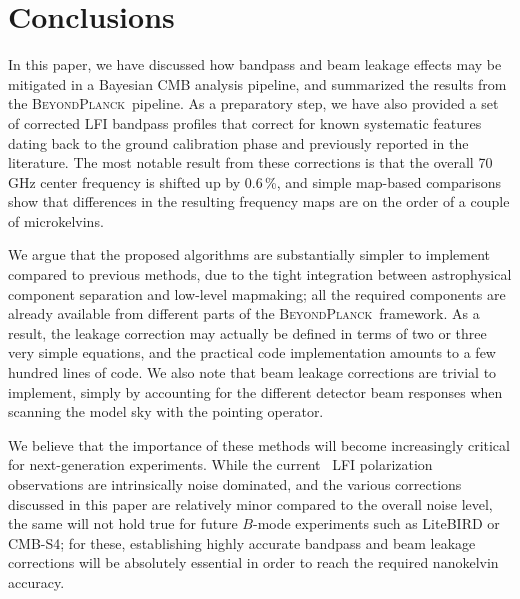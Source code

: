 \documentclass[twocolumn]{aa}
\newcommand{\BP}{\textsc{BeyondPlanck}}
\newcommand{\?}[1]{\textcolor{red}{{\bf [#1]}}}
\begin{document}
\section{Conclusions}
\label{sec:conclusion}

In this paper, we have discussed how bandpass and beam leakage effects may be
mitigated in a Bayesian CMB analysis pipeline, and summarized the results from
the \BP\ pipeline. As a preparatory step, we have also provided a set of
corrected LFI bandpass profiles that correct for known systematic features
dating back to the ground calibration phase and previously reported in the
literature. The most notable result from these corrections is that the overall
70\,GHz center frequency is shifted up by 0.6\,\%, and simple map-based
comparisons show that differences in the resulting frequency maps are on the
order of a couple of microkelvins. 

We argue that the proposed algorithms are substantially simpler to implement
compared to previous methods, due to the tight integration between astrophysical
component separation and low-level mapmaking; all the required components are
already available from different parts of the \BP\ framework. As a result, the
leakage correction may actually be defined in terms of two or three very simple
equations, and the practical code implementation amounts to a few hundred lines
of code. We also note that beam leakage corrections are trivial to implement,
simply by accounting for the different detector beam responses when scanning the
model sky with the pointing operator.

We believe that the importance of these methods will become increasingly
critical for next-generation experiments. While the current \Planck\ LFI
polarization observations are intrinsically noise dominated, and the various
corrections discussed in this paper are relatively minor compared to the overall
noise level, the same will not hold true for future $B$-mode experiments such as
LiteBIRD or CMB-S4; for these, establishing highly accurate bandpass and beam
leakage corrections will be absolutely essential in order to reach the required
nanokelvin accuracy.






\end{document}
